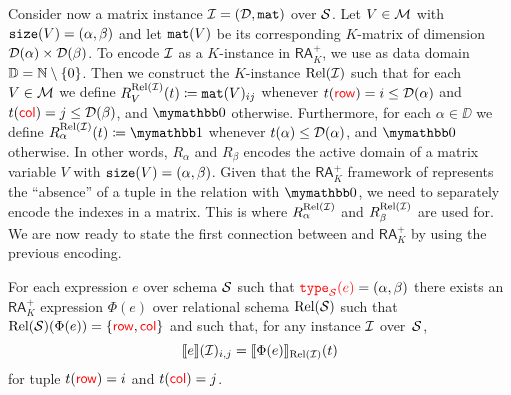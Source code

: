 Consider now a matrix instance $\mathcal{I} = (\mathcal{D},\texttt{mat})$ over $\mathcal{S}$.
Let $V\in\mathcal{M}$ with $\texttt{size}(V)=(\alpha,\beta)$ and let $\texttt{mat}(V)$ be its corresponding $K$-matrix of dimension $\mathcal{D}(\alpha)\times \mathcal{D}(\beta)$.
To encode $\mathcal{I}$ as a $K$-instance in $\mathsf{RA}_{K}^+$, we use as data domain $\mathbb{D} = \mathbb{N} \setminus \{0\}$. Then we construct the $K$-instance $\text{Rel}(\mathcal{I})$ such that for each $V\in\mathcal{M}$ we define 
$R_V^{\text{Rel}(\mathcal{I})}(t)\coloneqq \texttt{mat}(V)_{ij}$ whenever $t({\color{red} \mathsf{row}}) = i \leq \mathcal{D}(\alpha)$ and $t({\color{red} \mathsf{col}}) = j \leq \mathcal{D}(\beta)$, and $\kzero$ otherwise. Furthermore, for each $\alpha \in \DD$ we define $R_\alpha^{\text{Rel}(\I)}(t)\coloneqq \kone$ whenever $t(\alpha) \leq \mathcal{D}(\alpha)$, and $\kzero$ otherwise. In other words, $R_\alpha$ and $R_\beta$ encodes the active domain of a matrix variable $V$ with $\texttt{size}(V)=(\alpha,\beta)$. Given that the $\mathsf{RA}_{K}^+$ framework of \cite{GreenKT07} represents the ``absence'' of a tuple in the relation with $\kzero$, we need to separately encode the indexes in a matrix.
This is where $R_\alpha^{\text{Rel}(\mathcal{I})}$ and $R_\beta^{\text{Rel}(\mathcal{I})}$ are used for.
We are now ready to state the first connection between \langsum and $\mathsf{RA}_{K}^+$  by using the previous encoding.
\begin{proposition}\label{prop:sum_to_ara} 
	For each \langsum expression $e$ over schema $\mathcal{S}$ such that ${\color{red} \texttt{type}_{\mathcal{S}}(e)}=(\alpha,\beta)$
	there exists an $\mathsf{RA}_{K}^+$  expression $\Phi(e)$ over relational schema
	$\text{Rel}(\mathcal{S})$ such that $\text{Rel}(\mathcal{S})(\Phi(e))=\{{\color{red} \mathsf{row}},{\color{red} \mathsf{col}}\}$ and 
	such that, for any instance $\mathcal{I}$ over~$\mathcal{S}$,
	$$
	\llbracket e \rrbracket(\mathcal{I})_{i,j}=\llbracket \Phi(e) \rrbracket_{\text{Rel}(\mathcal{I})}(t)
	$$
	for tuple $t({\color{red} \mathsf{row}})=i$ and $t({\color{red} \mathsf{col}})=j$.
\end{proposition}



